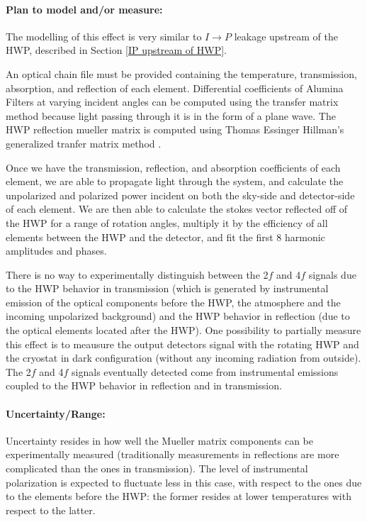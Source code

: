 \paragraph{Plan to model and/or measure:}
The modelling of this effect is very similar to $I\rightarrow P$ leakage upstream of the HWP, described in Section \ref{IP upstream of HWP}.

An optical chain file must be provided containing the temperature, transmission, absorption, and reflection of each element. 
Differential  coefficients of Alumina Filters at varying incident angles can be computed 
using the transfer matrix method because light passing through it is in the form of a plane wave.
The HWP reflection mueller matrix is computed using Thomas Essinger Hillman's generalized tranfer matrix method \cite{Essinger-Hileman2013}.

Once we have the transmission, reflection, and absorption coefficients of each element, we are able to propagate light through the system, and calculate the unpolarized and polarized power incident on both the sky-side and detector-side of each element. 
We are then able to calculate the stokes vector reflected off of the HWP for a range of rotation angles, multiply it by the efficiency of all elements between the HWP and the detector, and fit the first 8 harmonic amplitudes and phases.


There is no way to experimentally distinguish between the 2$f$ and 4$f$ signals due to the HWP behavior in transmission (which is generated by instrumental emission of the optical components before the HWP, the atmosphere and the incoming unpolarized background) and the HWP behavior in reflection (due to the optical elements located after the HWP). One possibility to partially measure this effect is to meausure the output detectors signal with the rotating HWP and the cryostat in dark configuration (without any incoming radiation from outside).
The 2$f$ and 4$f$ signals eventually detected come from instrumental emissions coupled to the HWP behavior in reflection and in transmission. 



\paragraph{Uncertainty/Range:}
Uncertainty resides in how well the Mueller matrix components can be experimentally measured (traditionally measurements in reflections are more complicated than the ones in transmission). The level of instrumental polarization is expected to fluctuate less in this case, with respect to the ones due to the elements before the HWP: the former resides at lower temperatures with respect to the latter. 

